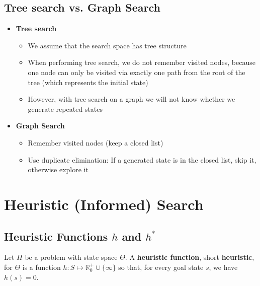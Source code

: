 \documentclass[conference, a4paper]{styles/acmsiggraph}
\begin{document}
    \subsection{Tree search vs. Graph Search}
        \begin{itemize}
            \item \textbf{Tree search}
                \begin{itemize}
                    \item We assume that the search space has tree structure
                    \item When performing tree search, we do not remember visited nodes, because one node can only be visited via exactly one path from the root of the tree (which represents the initial state)
                    \item However, with tree search on a graph we will not know whether we generate repeated states
                \end{itemize}
            \item \textbf{Graph Search}
                \begin{itemize}
                    \item Remember visited nodes (keep a closed list)
                    \item Use duplicate elimination: If a generated state is in the closed list, skip it, otherwise explore it
                \end{itemize}
        \end{itemize}
        
        
        
        
        
        
        
        
        
        
\section{Heuristic (Informed) Search}
    \subsection{Heuristic Functions $h$ and $h^*$}
        Let $\Pi$ be a problem with state space $\Theta$.
        A \textbf{heuristic function}, short \textbf{heuristic}, for $\Theta$ is a function $h: S \mapsto \mathbb{R}_0^+ \cup \{\infty\}$ so that, for every goal state $s$, we have $h(s) = 0$.\newline
        
\end{document}
